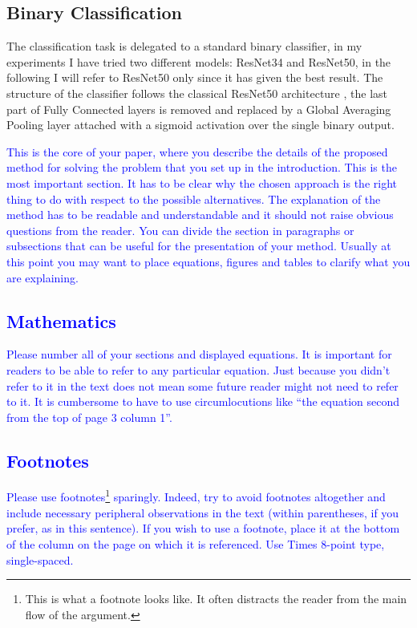 \documentclass[10pt,twocolumn,letterpaper]{article}
\begin{document}
   \subsection{Binary Classification}
   The classification task is delegated to a standard binary classifier, in my experiments I have tried two different models: ResNet34 and ResNet50, in the following I will refer to ResNet50 only since it has given the best result.
   The structure of the classifier follows the classical ResNet50 architecture \cite{resnet}, the last part of Fully Connected layers is removed and replaced by a Global Averaging Pooling layer attached with a sigmoid activation over the single binary output.



\textcolor{blue}{
This is the core of your paper, where you describe the details of the proposed method for solving the problem that you set up in the introduction. This is the most important section. It has to be clear why the chosen approach is the right thing to do with respect to the possible alternatives. The explanation of the method has to be readable and understandable and it should not raise obvious questions from the reader. 
You can divide the section in paragraphs or subsections that can be useful for the presentation of your method. Usually at this point you may want to place equations, figures and tables to clarify what you are explaining.
\subsection{Mathematics}
Please number all of your sections and displayed equations.  It is
important for readers to be able to refer to any particular equation.  Just
because you didn't refer to it in the text does not mean some future reader
might not need to refer to it.  It is cumbersome to have to use
circumlocutions like ``the equation second from the top of page 3 column
1''. 
\subsection{Footnotes}
Please use footnotes\footnote {This is what a footnote looks like.  It
often distracts the reader from the main flow of the argument.} sparingly.
Indeed, try to avoid footnotes altogether and include necessary peripheral
observations in
the text (within parentheses, if you prefer, as in this sentence).  If you
wish to use a footnote, place it at the bottom of the column on the page on
which it is referenced. Use Times 8-point type, single-spaced.
}
\end{document}

